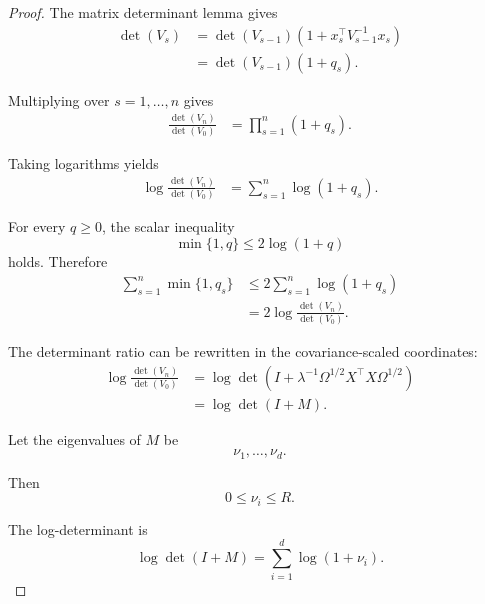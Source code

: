 \documentclass{article} %
\begin{document}
\begin{proof}
The matrix determinant lemma gives
\begin{align}
\label{eq:hyper-elliptical-proof-det-update}
\det(V_s)
&=
\det(V_{s-1})
\left(1+x_s^\top V_{s-1}^{-1}x_s\right)
\\
&=
\det(V_{s-1})(1+q_s).
\end{align}

Multiplying over \(s=1,\ldots,n\) gives
\begin{align}
\label{eq:hyper-elliptical-proof-product}
\frac{\det(V_n)}{\det(V_0)}
&=
\prod_{s=1}^{n}(1+q_s).
\end{align}

Taking logarithms yields
\begin{align}
\label{eq:hyper-elliptical-proof-logprod}
\log\frac{\det(V_n)}{\det(V_0)}
&=
\sum_{s=1}^{n}\log(1+q_s).
\end{align}

For every \(q\ge 0\), the scalar inequality
\begin{equation}
\label{eq:hyper-elliptical-proof-scalar-min}
\min\{1,q\}\le 2\log(1+q)
\end{equation}
holds.  Therefore
\begin{align}
\label{eq:hyper-elliptical-proof-first}
\sum_{s=1}^{n}\min\{1,q_s\}
&\le
2\sum_{s=1}^{n}\log(1+q_s)
\\
&=
2\log\frac{\det(V_n)}{\det(V_0)}.
\end{align}

The determinant ratio can be rewritten in the covariance-scaled coordinates:
\begin{align}
\label{eq:hyper-elliptical-proof-scaled-det}
\log\frac{\det(V_n)}{\det(V_0)}
&=
\log
\det
\left(
I+
\lambda^{-1}\Omega^{1/2}X^\top X\Omega^{1/2}
\right)
\\
&=
\log\det(I+M).
\end{align}

Let the eigenvalues of \(M\) be
\begin{equation}
\label{eq:hyper-elliptical-proof-eigs}
\nu_1,\ldots,\nu_d .
\end{equation}

Then
\begin{equation}
\label{eq:hyper-elliptical-proof-eigs-range}
0\le \nu_i\le R .
\end{equation}

The log-determinant is
\begin{equation}
\label{eq:hyper-elliptical-proof-logdet-eig}
\log\det(I+M)
=
\sum_{i=1}^{d}\log(1+\nu_i).
\end{equation}


\end{proof}
\end{document}
